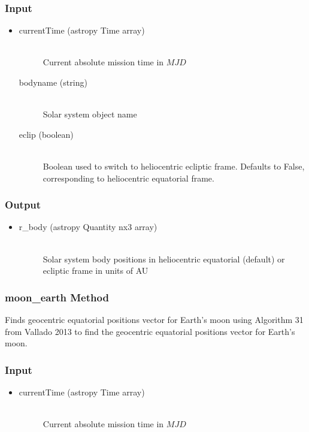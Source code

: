 \documentclass[cleanfoot]{asme2ej}
\begin{document}
\subsubsection*{Input}
\begin{itemize}
\item
\begin{description}
    \item[currentTime (astropy Time array)] \hfill \\ Current absolute mission time in $MJD$
    \item[bodyname (string)] \hfill \\ Solar system object name
    \item[eclip (boolean)] \hfill \\ Boolean used to switch to heliocentric ecliptic frame. Defaults to False, corresponding to heliocentric equatorial frame.
\end{description}
\end{itemize}
\subsubsection*{Output}
\begin{itemize}
\item
\begin{description}
    \item[r\_body (astropy Quantity nx3 array)] \hfill \\ Solar system body positions in heliocentric equatorial (default) or ecliptic frame in units of AU
\end{description}
\end{itemize}

\subsubsection{moon\_earth Method} 
Finds geocentric equatorial positions vector for Earth's moon using Algorithm 31 from Vallado 2013 to find the geocentric equatorial positions vector for Earth's moon.
\subsubsection*{Input}
\begin{itemize}
\item
\begin{description}
    \item[currentTime (astropy Time array)] \hfill \\ Current absolute mission time in $MJD$
\end{description}
\end{itemize}
\end{document}
